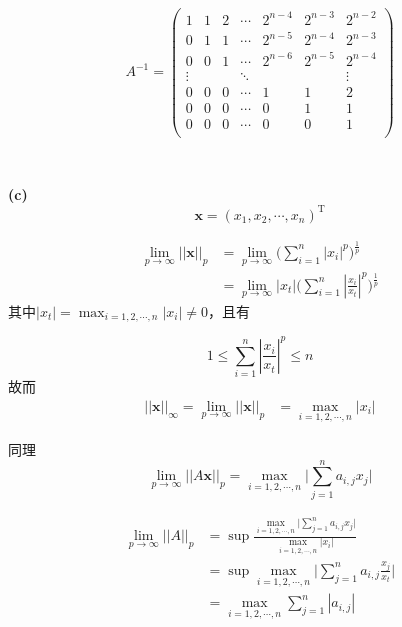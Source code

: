 \documentclass[UTF8]{ctexart}
\begin{document}
\begin{equation}\label{2-b-6}
A^{-1}=
\left(
\begin{array}{ccccccc}
    1 & 1 & 2 & \cdots & 2^{n-4} & 2^{n-3} & 2^{n-2}\\
    0 & 1 & 1 & \cdots & 2^{n-5}& 2^{n-4} & 2^{n-3}\\
    0 & 0 & 1 & \cdots & 2^{n-6} & 2^{n-5} & 2^{n-4}\\
    \vdots & & & \ddots & & & \vdots \\
    0 & 0 & 0 & \cdots & 1  & 1 & 2\\
    0 & 0 & 0 & \cdots & 0  & 1 & 1\\
    0 & 0 & 0 & \cdots & 0  & 0 & 1\\
\end{array}
\right)
\end{equation}

~\

\noindent\textbf{(c)}
$$
\mathbf{x}=(x_1,x_2,\cdots,x_n)^\mathrm{T}
$$

\begin{equation}\label{2-c-1}
\begin{aligned}
\lim_{p\rightarrow\infty} ||\mathbf{x}||_p&=\lim_{p\rightarrow\infty}\Big(\sum_{i=1}^n|x_i|^p\Big)^\frac{1}{p}\\
&=\lim_{p\rightarrow\infty}|x_t|\Big(\sum_{i=1}^n|\frac{x_i}{x_t}|^p\Big)^\frac{1}{p}
\end{aligned}
\end{equation}
其中$|x_t|=\max_{i=1,2,\cdots,n}{|x_i|}\neq 0$，且有

\begin{equation}\label{2-c-2}
    1\leq\sum_{i=1}^n|\frac{x_i}{x_t}|^p\leq n
\end{equation}
故而
\begin{equation}\label{2-c-3}
\begin{aligned}
||\mathbf{x}||_\infty=\lim_{p\rightarrow\infty} ||\mathbf{x}||_p&=\max_{i=1,2,\cdots,n}{|x_i|}
\end{aligned}
\end{equation}

同理
\begin{equation}\label{2-c-4}
\lim_{p\rightarrow\infty}||A\mathbf{x}||_p=\max_{i=1,2,\cdots,n}\Big|\sum_{j=1}^n a_{i,j}x_j\Big|
\end{equation}

\begin{equation}\label{2-c-5}
\begin{aligned}
\lim_{p\rightarrow\infty}||A||_p&=\sup\frac{\max_{i=1,2,\cdots,n}\Big|\sum_{j=1}^n a_{i,j}x_j\Big|}{\max_{i=1,2,\cdots,n}{|x_i|}}\\
&=\sup\max_{i=1,2,\cdots,n}\Big|\sum_{j=1}^n a_{i,j}\frac{x_j}{x_t}\Big|\\
&=\max_{i=1,2,\cdots,n}\sum_{j=1}^n|a_{i,j}|
\end{aligned}
\end{equation}
\end{document}
